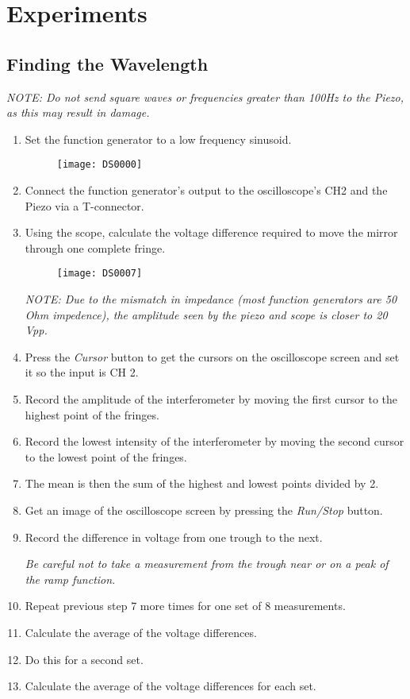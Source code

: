 
\section{Experiments}
	\subsection{Finding the Wavelength}

\emph{NOTE: Do not send square waves or frequencies greater than 100Hz to the
Piezo, as this may result in damage.}

\begin{enumerate}
 	\item Set the function generator to a low frequency sinusoid.
		\begin{figure}[ht!]
		\centering
		\texttt{[image: DS0000]}
		\end{figure}
    \item Connect the function generator's output to the oscilloscope's CH2 and
    the Piezo via a T-connector.
    \item Using the scope, calculate the voltage difference required to move the
    mirror through one complete fringe.
		\begin{figure}[ht!]
		\centering
		\texttt{[image: DS0007]}
		\end{figure}

    \emph{NOTE: Due to the mismatch in impedance (most function generators are
    50 Ohm impedence), the amplitude seen by the piezo and scope is closer to 20
    Vpp.}
	
	\item Press the \emph{Cursor} button to get the cursors on the oscilloscope
	screen and set it so the input is CH 2.
	\item Record the amplitude of the interferometer by moving the first cursor
	to the highest point of the fringes.
	\item Record the lowest intensity of the interferometer by moving the second
	cursor to the lowest point of the fringes.
	\item The mean is then the sum of the highest and lowest points divided by
	2.
	\item Get an image of the oscilloscope screen by pressing the
	\emph{Run/Stop} button. 
	\item Record the difference in voltage from one trough to the next. 
	
    \emph{Be careful not to take a measurement from the trough near or on a peak
    of the ramp function.}
	
	\item Repeat previous step 7 more times for one set of 8 measurements. 
	\item Calculate the average of the voltage differences.
	\item Do this for a second set.
	\item Calculate the average of the voltage differences for each set.
\end{enumerate}



